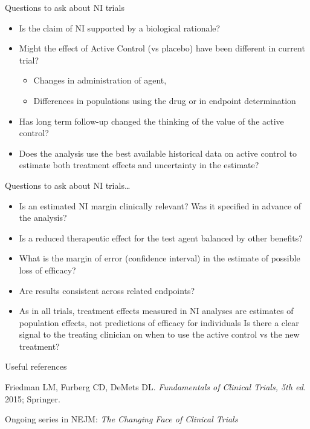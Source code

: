 \documentclass[ignorenonframetext,]{beamer}
\providecommand{\tightlist}{%
\setlength{\itemsep}{0pt}\setlength{\parskip}{0pt}}
\begin{document}
\begin{frame}{Questions to ask about NI trials}

\begin{itemize}
\item
  Is the claim of NI supported by a biological rationale?
\item
  Might the effect of Active Control (vs placebo) have been different in
  current trial?

  \begin{itemize}
  \tightlist
  \item
    Changes in administration of agent,\\
  \item
    Differences in populations using the drug or in endpoint
    determination
  \end{itemize}
\item
  Has long term follow-up changed the thinking of the value of the
  active control?
\item
  Does the analysis use the best available historical data on active
  control to estimate both treatment effects and uncertainty in the
  estimate?
\end{itemize}

\end{frame}

\begin{frame}{Questions to ask about NI trials\ldots{}}

\begin{itemize}
\item
  Is an estimated NI margin clinically relevant? Was it specified in
  advance of the analysis?
\item
  Is a reduced therapeutic effect for the test agent balanced by other
  benefits?
\item
  What is the margin of error (confidence interval) in the estimate of
  possible loss of efficacy?
\item
  Are results consistent across related endpoints?
\item
  As in all trials, treatment effects measured in NI analyses are
  estimates of population effects, not predictions of efficacy for
  individuals Is there a clear signal to the treating clinician on when
  to use the active control vs the new treatment?
\end{itemize}

\end{frame}

\begin{frame}{Useful references}

Friedman LM, Furberg CD, DeMets DL.
\textit{Fundamentals of Clinical Trials,  5th ed.} 2015; Springer.

Ongoing series in NEJM: \textit{The Changing Face of Clinical Trials}

\end{frame}
\end{document}
